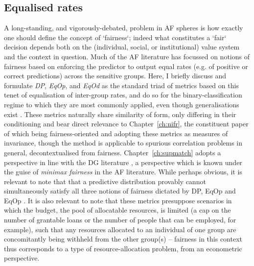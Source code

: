 \subsection{Equalised rates}\label{sec:equalised-rates}
%
A long-standing, and vigorously-debated, problem in \ac{AF} spheres is how exactly one should
define the concept of `fairness`; indeed what constitutes a `fair` decision depends both on the
(individual, social, or institutional) value system and the context in question.
%
Much of the \ac{AF} literature has focussed on notions of fairness based on enforcing the predictor
to output equal rates (e.g. of positive or correct predictions) across the sensitive groups.
%
Here, I briefly discuss and formulate \emph{\ac{DP}}, \emph{\ac{EqOp}}, and \emph{\ac{EqOd}} as
the standard triad of metrics based on this tenet of equalisation of inter-group rates, and do so
for the binary-classification regime to which they are most commonly applied, even though
generalisations exist \citep{woodworth2017learning}. 
%
These metrics naturally share similarity of form, only differing in their conditioning and bear
direct relevance to Chapter~\ref{ch:nifr}, the constituent paper of which being fairness-oriented
and adopting these metrics as measures of invariance, though the method is applicable to spurious
correlation problems in general, decontextualised from fairness.
%
Chapter~\ref{ch:supmatch} adopts a perspective in line with the \ac{DG} literature
\citep{sagawa2019distributionally}, a perspective which is known under the guise of \emph{minimax
fairness} in the \ac{AF} literature.
%
While perhaps obvious, it is relevant to note that that a predictive distribution provably cannot
simultaneously satisfy all three notions of fairness dictated by \ac{DP}, \ac{EqOp} and \ac{EqOp}
\citep{kleinberg2016inherent}.
%
It is also relevant to note that these metrics presuppose scenarios in which the budget, the pool
of allocatable resources, is limited (a cap on the number of grantable loans or the number of
people that can be employed, for example), such that any resources allocated to an individual of
one group are concomitantly being withheld from the other group(s) -- fairness in this context thus
corresponds to a type of resource-allocation problem, from an econometric perspective.
%

